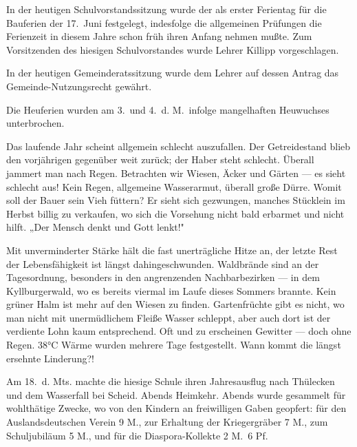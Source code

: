 

%
In der heutigen Schulvorstandssitzung wurde der\ob
als erster Ferientag für die Bauferien der 17.\ Juni\ob
festgelegt, indesfolge die allgemeinen Prüfungen die\ob
Ferienzeit in diesem Jahre schon früh ihren Anfang\ob
nehmen mußte.\ob
Zum Vorsitzenden des hiesigen Schulvorstandes wurde\ob
Lehrer Killipp vorgeschlagen.

In der heutigen Gemeinderatssitzung wurde\ob
dem Lehrer auf dessen Antrag das Gemeinde-Nutzungsrecht\ob
gewährt.

%
Die Heuferien wurden am 3.\ und 4.\ d. M.\ infolge\ob
mangelhaften Heuwuchses unterbrochen.

Das laufende Jahr scheint allgemein schlecht auszufallen.\ob
Der Getreidestand blieb den vorjährigen gegenüber\ob
weit zurück; der Haber steht schlecht. Überall jammert\ob
man nach Regen. Betrachten wir Wiesen, Äcker\ob
und Gärten — es sieht schlecht aus! Kein Regen,\ob
allgemeine Wasserarmut, überall große Dürre. Womit\ob
soll der Bauer sein Vieh füttern? Er sieht sich gezwungen,\ob
manches Stücklein im Herbst billig zu verkaufen, wo sich die\ob
Vorsehung nicht bald erbarmet und nicht hilft. „Der\ob
Mensch denkt und Gott lenkt!"

%
Mit unverminderter Stärke hält die fast unerträgliche\ob
Hitze an, der letzte Rest der Lebensfähigkeit ist längst\ob
dahingeschwunden. Waldbrände sind an der Tagesordnung,\ob
besonders in den angrenzenden Nachbarbezirken — in dem\ob
Kyllburgerwald, wo es bereits viermal im Laufe dieses\ob
Sommers brannte. Kein grüner Halm ist mehr auf den Wiesen\ob
zu finden. Gartenfrüchte gibt es nicht, wo man nicht mit\ob
unermüdlichem Fleiße Wasser schleppt, aber auch dort ist der\ob
verdiente Lohn kaum entsprechend. Oft und zu erscheinen\ob
Gewitter — doch ohne Regen. 38°C Wärme wurden\ob
mehrere Tage festgestellt. Wann kommt die längst\ob
ersehnte Linderung?!

%
Am 18.\ d. Mts. machte die hiesige Schule ihren Jahresausflug\ob
nach Thülecken und dem Wasserfall bei Scheid. Abends\ob
Heimkehr. Abends wurde gesammelt für wohlthätige\ob
Zwecke, wo von den Kindern an freiwilligen Gaben geopfert:\ob
für den Auslandsdeutschen Verein 9 M., zur Erhaltung der\ob
Kriegergräber 7 M., zum Schuljubiläum 5 M.,\ob
und für die Diaspora-Kollekte 2 M.\ 6 Pf.
\pend
